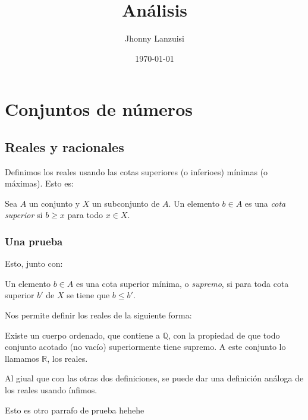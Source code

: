 \documentclass[11pt]{book}
\author{Jhonny Lanzuisi}
\date{\today}
\title{Análisis}
\begin{document}
\maketitle
\setcounter{tocdepth}{2}
\tableofcontents


\part{Conjuntos de números}
\label{sec:org2658083}

\chapter{Reales y racionales}
\label{sec:orgea67cd8}
Definimos los reales usando las cotas superiores (o inferioes) mínimas (o máximas).
Esto es:

\begin{definition}
Sea \(A\) un conjunto y \(X\) un subconjunto de \(A\).
Un elemento \(b\in A\) es una \emph{cota superior} si \(b\geq x\) para todo \(x\in X\).
\end{definition}

\section{Una prueba}
\label{sec:orgad4c69c}
Esto, junto con:

\begin{definition}
Un elemento \(b\in A\) es una cota superior mínima, o \emph{supremo}, si
para toda cota superior \(b'\) de \(X\) se tiene que \(b\leq b'\).
\end{definition}

Nos permite definir los reales de la siguiente forma:

\begin{definition}
Existe un cuerpo ordenado, que contiene a \(\mathbb{Q}\),
con la propiedad de que todo conjunto acotado (no vacío) superiormente tiene supremo.
A este conjunto lo llamamos \(\mathbb{R}\), los reales.
\end{definition}

Al giual que con las otras dos definiciones, 
se puede dar una definición análoga de los reales usando ínfimos.

Esto es otro parrafo de prueba hehehe
\end{document}
